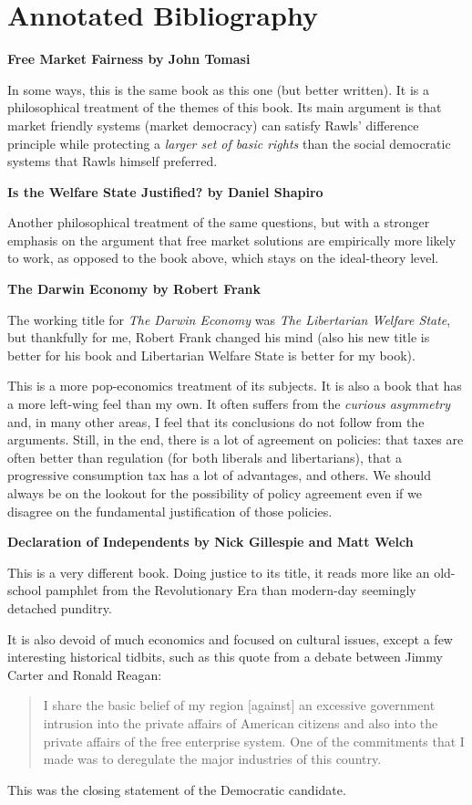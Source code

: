 \def\book#1{\bigskip\textbf{#1}\par}%
\chapter{Annotated Bibliography}

\book{Free Market Fairness by John Tomasi}

In some ways, this is the same book as this one (but better written). It is a
philosophical treatment of the themes of this book. Its main argument is that
market friendly systems (market democracy) can satisfy Rawls' difference
principle while protecting a \emph{larger set of basic rights} than the social
democratic systems that Rawls himself preferred.

\book{Is the Welfare State Justified? by Daniel Shapiro}

Another philosophical treatment of the same questions, but with a stronger
emphasis on the argument that free market solutions are empirically more likely
to work, as opposed to the book above, which stays on the ideal-theory level.

\book{The Darwin Economy by Robert Frank}

The working title for \emph{The Darwin Economy} was \emph{The Libertarian
Welfare State}, but thankfully for me, Robert Frank changed his mind (also his
new title is better for his book and Libertarian Welfare State is better for my
book).

This is a more pop-economics treatment of its subjects. It is also a book that
has a more left-wing feel than my own. It often suffers from the \emph{curious
asymmetry} and, in many other areas, I feel that its conclusions do not follow
from the arguments. Still, in the end, there is a lot of agreement on policies:
that taxes are often better than regulation (for both liberals and
libertarians), that a progressive consumption tax has a lot of advantages, and
others. We should always be on the lookout for the possibility of policy
agreement even if we disagree on the fundamental justification of those
policies.


\book{Declaration of Independents by Nick Gillespie and Matt Welch}

This is a very different book. Doing justice to its title, it reads more like
an old-school pamphlet from the Revolutionary Era than modern-day seemingly
detached punditry.

It is also devoid of much economics and focused on cultural issues, except a
few interesting historical tidbits, such as this quote from a debate between
Jimmy Carter and Ronald Reagan:

\begin{quote}
I share the basic belief of my region [against] an excessive government
intrusion into the private affairs of American citizens and also into the
private affairs of the free enterprise system. One of the commitments that I
made was to deregulate the major industries of this country.
\end{quote}

This was the closing statement of the Democratic candidate.

